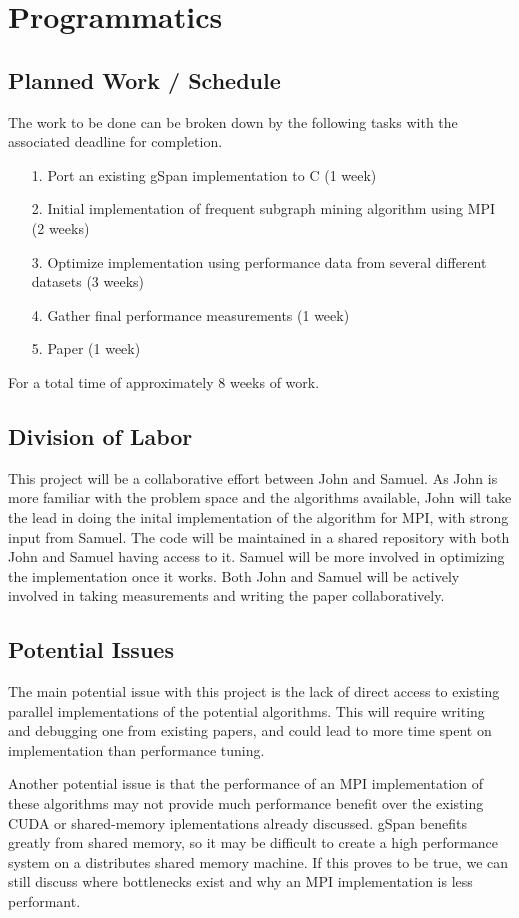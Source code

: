 \section{Programmatics}
\label{sec:programmatics}

\subsection{Planned Work / Schedule}
\label{sec:programmatics:work}

The work to be done can be broken down by the following tasks with the
associated deadline for completion.

\begin{itemize}
	\item[1.]{Port an existing gSpan implementation to C (1 week)}
	\item[2.]{Initial implementation of frequent subgraph mining
		  algorithm using MPI (2 weeks)}
	\item[3.]{Optimize implementation using performance data from several
		  different datasets (3 weeks)}
	\item[4.]{Gather final performance measurements (1 week)}
	\item[5.]{Paper (1 week)}
\end{itemize}

For a total time of approximately 8 weeks of work.

\subsection{Division of Labor}

This project will be a collaborative effort between John and Samuel.
As John is more familiar with the problem space and the algorithms available,
John will take the lead in doing the inital implementation of the algorithm
for MPI, with strong input from Samuel.  The code will be maintained in a 
shared repository with both John and Samuel having access to it. Samuel 
will be more involved in optimizing the implementation once it works.  Both
John and Samuel will be actively involved in taking measurements and writing
the paper collaboratively.

\subsection{Potential Issues}

The main potential issue with this project is the lack of direct access to
existing parallel implementations of the potential algorithms. This will 
require writing and debugging one from existing papers, and could lead to 
more time spent on implementation than performance tuning.  

Another potential issue is that the performance of an MPI implementation 
of these algorithms may not provide much performance benefit over the 
existing CUDA or shared-memory iplementations already discussed.  gSpan 
benefits greatly from shared memory, so it may be difficult to create
a high performance system on a distributes shared memory machine. If this
proves to be true, we can still discuss where bottlenecks exist and why
an MPI implementation is less performant.

